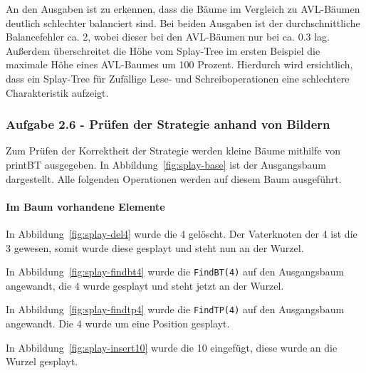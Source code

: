 An den Ausgaben ist zu erkennen, dass die Bäume im Vergleich zu AVL-Bäumen deutlich schlechter
balanciert sind.
Bei beiden Ausgaben ist der durchschnittliche Balancefehler ca. 2, wobei dieser bei den
AVL-Bäumen nur bei ca. 0.3 lag.
Außerdem überschreitet die Höhe vom Splay-Tree im ersten Beispiel die maximale Höhe eines AVL-Baumes
um 100 Prozent.
Hierdurch wird ersichtlich, dass ein Splay-Tree für Zufällige Lese- und Schreiboperationen eine
schlechtere Charakteristik aufzeigt.

\subsubsection{Aufgabe 2.6 - Prüfen der Strategie anhand von Bildern}
Zum Prüfen der Korrektheit der Strategie werden kleine Bäume mithilfe von printBT ausgegeben.
In Abbildung~\ref{fig:splay-base} ist der Ausgangsbaum dargestellt.
Alle folgenden Operationen werden auf diesem Baum ausgeführt.

\paragraph{Im Baum vorhandene Elemente}
In Abbildung~\ref{fig:splay-del4} wurde die 4 gelöscht.
Der Vaterknoten der 4 ist die 3 gewesen, somit wurde diese gesplayt und steht nun an der Wurzel.

In Abbildung~\ref{fig:splay-findbt4} wurde die \verb|FindBT(4)| auf den Ausgangsbaum angewandt,
die 4 wurde gesplayt und steht jetzt an der Wurzel.

In Abbildung~\ref{fig:splay-findtp4} wurde die \verb|FindTP(4)| auf den Ausgangsbaum angewandt.
Die 4 wurde um eine Position gesplayt.

In Abbildung~\ref{fig:splay-insert10} wurde die 10 eingefügt, diese wurde an die Wurzel gesplayt.

